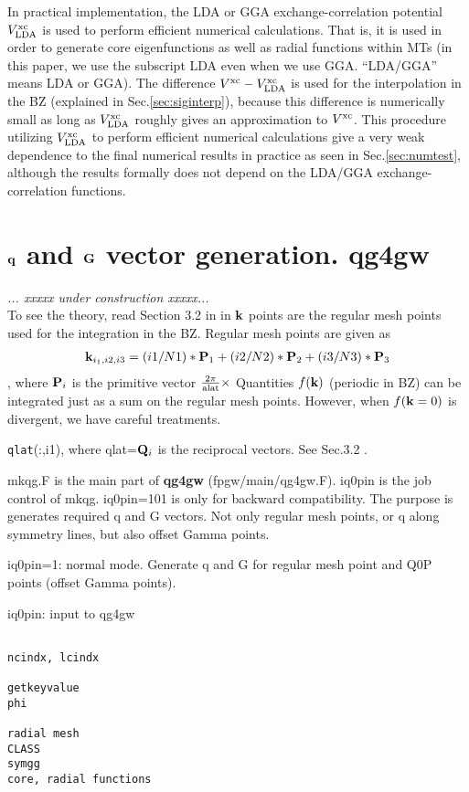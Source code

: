 \documentclass[a4paper,10pt,fleqn]{article}
\def\vxc{V^{\rm xc}}
\def\bfP{{\bf P}}
\def\underconstruction{{\it... xxxxx under construction xxxxx...\\}}
\newcommand{\bfq}{{\bf q}}
\newcommand{\bfk}{{\bf k}}
\newcommand{\bfQ}{{\bf Q}}
\newcommand{\bfG}{{\bf G}}
\newcommand{\exe}[1]{{\bf #1}}
\newcommand{\raw}[1]{{\tt #1}}
\newcommand{\qlat}{{\raw{qlat}}}
\begin{document}
In practical implementation, the LDA or GGA exchange-correlation
potential $V^{\rm xc}_{\rm LDA}$ is used to perform efficient numerical calculations.
That is, it is used in order to generate core eigenfunctions as well as radial functions within MTs
(in this paper, we use the subscript LDA even when we use GGA. ``LDA/GGA'' means LDA or GGA).
The difference $\vxc-V^{\rm xc}_{\rm LDA}$ is used 
for the interpolation in the BZ (explained in Sec.\ref{sec:siginterp}),
because this difference is numerically small as long as 
$V^{\rm xc}_{\rm LDA}$ roughly gives an approximation to $\vxc$.
This procedure utilizing $V^{\rm xc}_{\rm LDA}$ to perform efficient numerical calculations
give a very weak dependence to the final numerical results in practice as seen in Sec.\ref{sec:numtest},
although the results formally does not depend on the LDA/GGA exchange-correlation functions.


\section{$\bfq$ and $\bfG$ vector generation. qg4gw}
\underconstruction
To see the theory, read Section 3.2 in in \cite{kotani_quasiparticle_2014}
$\bfk$ points are the regular mesh points used for the integration
in the BZ. Regular mesh points are given as
\begin{eqnarray}
\bfk_{i_1,i2,i3}=(i1/N1)*\bfP_1+(i2/N2)*\bfP_2+(i3/N3)*\bfP_3
\end{eqnarray}
, where $\bfP_i$ is the primitive vector $\frac{2\pi}{\rm alat} \times$
Quantities $f(\bfk)$ (periodic in BZ) can
be integrated just as a sum on the regular mesh points.
However, when  $f(\bfk=0)$ is divergent, we have careful treatments.

\qlat(:,i1), where qlat=$\bfQ_i$ is the reciprocal vectors.
See Sec.3.2 .

mkqg.F is the main part of \exe{qg4gw} (fpgw/main/qg4gw.F).
iq0pin is the job control of mkqg. iq0pin=101 is only for backward compatibility. 
The purpose is generates required q and G vectors.
Not only regular mesh points, or q along symmetry lines, 
but also offset Gamma points.

iq0pin=1: normal mode. Generate q and G for regular mesh point and Q0P
points (offset Gamma points).

iq0pin: input to qg4gw

\begin{verbatim}

ncindx, lcindx

getkeyvalue
phi

radial mesh
CLASS
symgg
core, radial functions

\end{verbatim}
\end{document}

